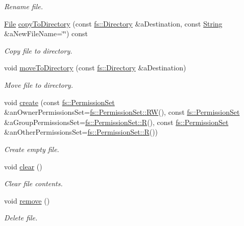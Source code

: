 \begin{DoxyCompactItemize}
\begin{DoxyCompactList}\small\item\em Rename file. \end{DoxyCompactList}\item 
\hyperlink{classlibrary_1_1core_1_1fs_1_1_file}{File} \hyperlink{classlibrary_1_1core_1_1fs_1_1_file_a9fd8a0cca72e2414f071d6045c0a1a0d}{copy\+To\+Directory} (const \hyperlink{classlibrary_1_1core_1_1fs_1_1_directory}{fs\+::\+Directory} \&a\+Destination, const \hyperlink{classlibrary_1_1core_1_1types_1_1_string}{String} \&a\+New\+File\+Name=\char`\"{}\char`\"{}) const
\begin{DoxyCompactList}\small\item\em Copy file to directory. \end{DoxyCompactList}\item 
void \hyperlink{classlibrary_1_1core_1_1fs_1_1_file_ac81efdfeb17ea50abe23d96f69bc15ae}{move\+To\+Directory} (const \hyperlink{classlibrary_1_1core_1_1fs_1_1_directory}{fs\+::\+Directory} \&a\+Destination)
\begin{DoxyCompactList}\small\item\em Move file to directory. \end{DoxyCompactList}\item 
void \hyperlink{classlibrary_1_1core_1_1fs_1_1_file_aa83b1f11be8c9106e780266dc097d03c}{create} (const \hyperlink{classlibrary_1_1core_1_1fs_1_1_permission_set}{fs\+::\+Permission\+Set} \&an\+Owner\+Permissions\+Set=\hyperlink{classlibrary_1_1core_1_1fs_1_1_permission_set_a9722204cdc11a0171e1a115d449a134b}{fs\+::\+Permission\+Set\+::\+RW}(), const \hyperlink{classlibrary_1_1core_1_1fs_1_1_permission_set}{fs\+::\+Permission\+Set} \&a\+Group\+Permissions\+Set=\hyperlink{classlibrary_1_1core_1_1fs_1_1_permission_set_a48d447273c118d6a7c81aebb505189c6}{fs\+::\+Permission\+Set\+::R}(), const \hyperlink{classlibrary_1_1core_1_1fs_1_1_permission_set}{fs\+::\+Permission\+Set} \&an\+Other\+Permissions\+Set=\hyperlink{classlibrary_1_1core_1_1fs_1_1_permission_set_a48d447273c118d6a7c81aebb505189c6}{fs\+::\+Permission\+Set\+::R}())
\begin{DoxyCompactList}\small\item\em Create empty file. \end{DoxyCompactList}\item 
void \hyperlink{classlibrary_1_1core_1_1fs_1_1_file_a0b95ab08dd8df2cc28b2e42a72ae0b9a}{clear} ()
\begin{DoxyCompactList}\small\item\em Clear file contents. \end{DoxyCompactList}\item 
void \hyperlink{classlibrary_1_1core_1_1fs_1_1_file_a438408d402b994d76d4de3829ec67dbc}{remove} ()
\begin{DoxyCompactList}\small\item\em Delete file. \end{DoxyCompactList}\end{DoxyCompactItemize}
